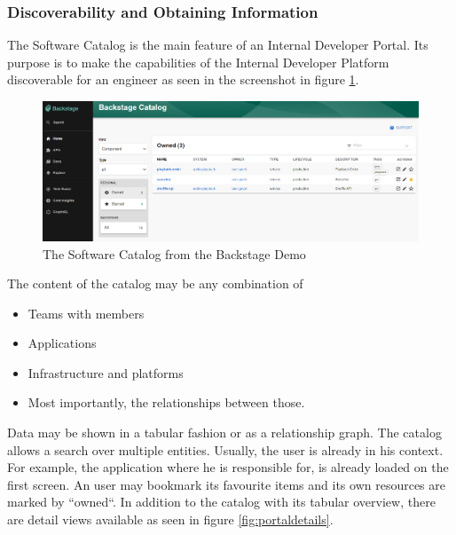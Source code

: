 \documentclass[a4paper,12pt]{article}
\begin{document}
    \subsubsection{Discoverability and Obtaining Information}
    \label{sssec:disc}
    The Software Catalog is the main feature of an Internal Developer Portal.
    Its purpose is to make the capabilities of the Internal Developer Platform discoverable for an engineer as seen in the
    screenshot in figure \ref{fig:catalog}.\\

    \begin{figure}[h]
        \includegraphics[width=\linewidth]{backstage_catalog}
        \caption{The Software Catalog from the Backstage Demo\parencite{backstagedemo}}
        \label{fig:catalog}
    \end{figure}
    The content of the catalog may be any combination of
    \begin{itemize}
        \item Teams with members
        \item Applications
        \item Infrastructure and platforms
        \item Most importantly, the relationships between those.
    \end{itemize}
    Data may be shown in a tabular fashion or as a relationship graph.
    The catalog allows a search over multiple entities.
    Usually, the user is already in his context.
    For example, the application where he is responsible for, is already loaded on the first screen.
    An user may bookmark its favourite items and its own resources are marked by ``owned``.
    In addition to the catalog with its tabular overview, there are detail views available as seen in figure \ref{fig:portaldetails}.
\end{document}
